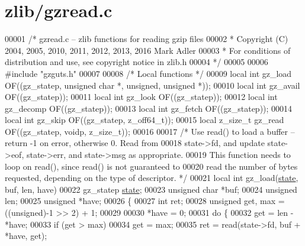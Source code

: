 \hypertarget{zlib_2gzread_8c_source}{}\section{zlib/gzread.c}
\label{zlib_2gzread_8c_source}

\begin{DoxyCode}
00001 \textcolor{comment}{/* gzread.c -- zlib functions for reading gzip files}
00002 \textcolor{comment}{ * Copyright (C) 2004, 2005, 2010, 2011, 2012, 2013, 2016 Mark Adler}
00003 \textcolor{comment}{ * For conditions of distribution and use, see copyright notice in zlib.h}
00004 \textcolor{comment}{ */}
00005 
00006 \textcolor{preprocessor}{#include "gzguts.h"}
00007 
00008 \textcolor{comment}{/* Local functions */}
00009 local \textcolor{keywordtype}{int} gz\_load OF((gz\_statep, \textcolor{keywordtype}{unsigned} \textcolor{keywordtype}{char} *, \textcolor{keywordtype}{unsigned}, \textcolor{keywordtype}{unsigned} *));
00010 local \textcolor{keywordtype}{int} gz\_avail OF((gz\_statep));
00011 local \textcolor{keywordtype}{int} gz\_look OF((gz\_statep));
00012 local \textcolor{keywordtype}{int} gz\_decomp OF((gz\_statep));
00013 local \textcolor{keywordtype}{int} gz\_fetch OF((gz\_statep));
00014 local \textcolor{keywordtype}{int} gz\_skip OF((gz\_statep, z\_off64\_t));
00015 local z\_size\_t gz\_read OF((gz\_statep, voidp, z\_size\_t));
00016 
00017 \textcolor{comment}{/* Use read() to load a buffer -- return -1 on error, otherwise 0.  Read from}
00018 \textcolor{comment}{   state->fd, and update state->eof, state->err, and state->msg as appropriate.}
00019 \textcolor{comment}{   This function needs to loop on read(), since read() is not guaranteed to}
00020 \textcolor{comment}{   read the number of bytes requested, depending on the type of descriptor. */}
00021 local \textcolor{keywordtype}{int} gz\_load(\hyperlink{structstate}{state}, buf, len, have)
00022     gz\_statep \hyperlink{structstate}{state};
00023     \textcolor{keywordtype}{unsigned} \textcolor{keywordtype}{char} *buf;
00024     \textcolor{keywordtype}{unsigned} len;
00025     \textcolor{keywordtype}{unsigned} *have;
00026 \{
00027     \textcolor{keywordtype}{int} ret;
00028     \textcolor{keywordtype}{unsigned} \textcolor{keyword}{get}, max = ((unsigned)-1 >> 2) + 1;
00029 
00030     *have = 0;
00031     \textcolor{keywordflow}{do} \{
00032         \textcolor{keyword}{get} = len - *have;
00033         \textcolor{keywordflow}{if} (\textcolor{keyword}{get} > max)
00034             \textcolor{keyword}{get} = max;
00035         ret = read(state->fd, buf + *have, \textcolor{keyword}{get});

\end{DoxyCode}
